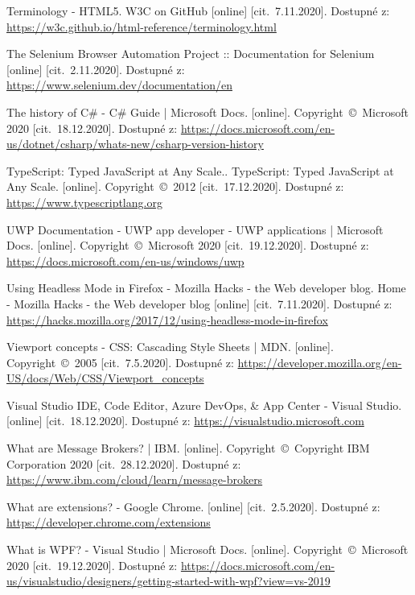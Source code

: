 \begin{thebibliography}{99}
 Terminology - HTML5. W3C on GitHub [online] [cit.~7.11.2020]. Dostupné z: \url{https://w3c.github.io/html-reference/terminology.html}

 The Selenium Browser Automation Project :: Documentation for Selenium [online] [cit.~2.11.2020]. Dostupné z: \url{https://www.selenium.dev/documentation/en}

 The history of C\# - C\# Guide | Microsoft Docs. [online]. Copyright~©~Microsoft 2020 [cit.~18.12.2020]. Dostupné z: \url{https://docs.microsoft.com/en-us/dotnet/csharp/whats-new/csharp-version-history}

 TypeScript: Typed JavaScript at Any Scale.. TypeScript: Typed JavaScript at Any Scale. [online]. Copyright~©~2012 [cit.~17.12.2020]. Dostupné z: \url{https://www.typescriptlang.org}

 UWP Documentation - UWP app developer - UWP applications | Microsoft Docs. [online]. Copyright~©~Microsoft 2020 [cit.~19.12.2020]. Dostupné z: \url{https://docs.microsoft.com/en-us/windows/uwp}

 Using Headless Mode in Firefox - Mozilla Hacks - the Web developer blog. Home - Mozilla Hacks - the Web developer blog [online] [cit.~7.11.2020]. Dostupné z: \url{https://hacks.mozilla.org/2017/12/using-headless-mode-in-firefox}

 Viewport concepts - CSS: Cascading Style Sheets | MDN. [online]. Copyright~©~2005 [cit.~7.5.2020]. Dostupné z: \url{https://developer.mozilla.org/en-US/docs/Web/CSS/Viewport_concepts}

 Visual Studio IDE, Code Editor, Azure DevOps, \& App Center - Visual Studio. [online] [cit.~18.12.2020]. Dostupné z: \url{https://visualstudio.microsoft.com}

 What are Message Brokers? | IBM. [online]. Copyright~©~Copyright IBM Corporation 2020 [cit.~28.12.2020]. Dostupné z: \url{https://www.ibm.com/cloud/learn/message-brokers}

 What are extensions? - Google Chrome. [online] [cit.~2.5.2020]. Dostupné z: \url{https://developer.chrome.com/extensions}

 What is WPF? - Visual Studio | Microsoft Docs. [online]. Copyright~©~Microsoft 2020 [cit.~19.12.2020]. Dostupné z: \url{https://docs.microsoft.com/en-us/visualstudio/designers/getting-started-with-wpf?view=vs-2019}


\end{thebibliography}
